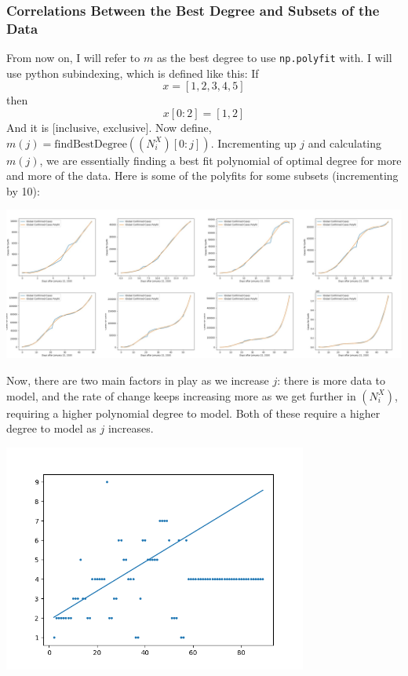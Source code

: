 \documentclass{report}
\begin{document}
            \subsubsection{Correlations Between the Best Degree and Subsets of the Data}
                From now on, I will refer to $m$ as the best degree to use \lstinline{np.polyfit} with. I will use python subindexing, which is defined like this: If
                $$x = [1,2,3,4,5]$$
                then
                $$x[0:2] = [1,2]$$
                And it is [inclusive, exclusive]. Now define, $m(j) = \text{findBestDegree}((N_i^X)[0:j])$. Incrementing up $j$ and calculating $m(j)$, we are essentially finding a best fit polynomial of optimal degree for more and more of the data. Here is some of the polyfits for some subsets (incrementing by 10):
                \begin{center}
                    \includegraphics[width=\textwidth]{plots/global/fit-merged.png}
                \end{center}
                Now, there are two main factors in play as we increase $j$: there is more data to model, and the rate of change keeps increasing more as we get further in $(N_i^X)$, requiring a higher polynomial degree to model. Both of these require a higher degree to model as $j$ increases. 
                \begin{center}
                    \includegraphics[width=10cm]{plots/global/degree_vs_subset.png}
                \end{center}
\end{document}
